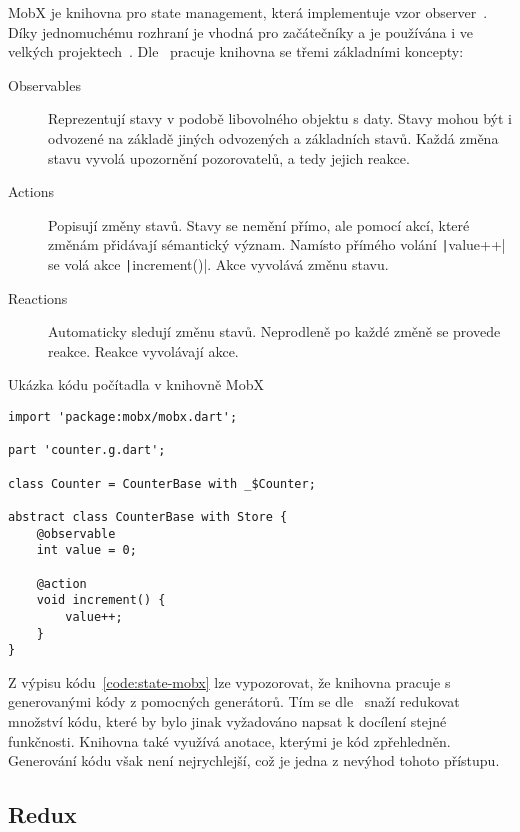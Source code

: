 MobX je knihovna pro state management,
která implementuje vzor observer~\cite{mobx_core_concepts}.
Díky jednomuchému rozhraní je vhodná pro začátečníky
a je používána i ve velkých projektech~\cite{mobx_core_concepts}.
Dle~\cite{mobx_core_concepts} pracuje knihovna se třemi základními koncepty:

\begin{description}
    \item[Observables] Reprezentují stavy v podobě libovolného objektu s daty.
    Stavy mohou být i odvozené na základě jiných odvozených a základních stavů.
    Každá změna stavu vyvolá upozornění pozorovatelů, a tedy jejich reakce.
    \item[Actions] Popisují změny stavů.
    Stavy se nemění přímo,
    ale pomocí akcí,
    které změnám přidávají sémantický význam.
    Namísto přímého volání \texttt|value++| se volá akce
    \texttt|increment()|.
    Akce vyvolává změnu stavu.
    \item[Reactions] Automaticky sledují změnu stavů.
    Neprodleně po každé změně se provede reakce.
    Reakce vyvolávají akce.
\end{description}

\begin{listing}
    \caption{Ukázka kódu počítadla v knihovně MobX~\cite{mobx_core_concepts}}
    \label{code:state-mobx}
    \begin{verbatim}
import 'package:mobx/mobx.dart';

part 'counter.g.dart';

class Counter = CounterBase with _$Counter;

abstract class CounterBase with Store {
    @observable
    int value = 0;

    @action
    void increment() {
        value++;
    }
}
    \end{verbatim}
\end{listing}

Z výpisu kódu~\ref{code:state-mobx} lze vypozorovat,
že knihovna pracuje s generovanými kódy z pomocných generátorů.
Tím se dle~\cite{mobx_core_concepts} snaží redukovat množství kódu,
které by bylo jinak vyžadováno napsat k docílení stejné funkčnosti.
Knihovna také využívá anotace,
kterými je kód zpřehledněn.
Generování kódu však není nejrychlejší,
což je jedna z nevýhod tohoto přístupu.

\subsection{Redux}

